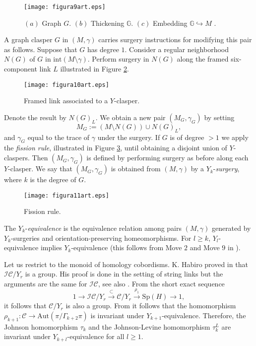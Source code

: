 \documentclass[10pt]{amsart}
\numberwithin{equation}{section}
\numberwithin{equation}{section}
\theoremstyle{definition}
\begin{document}
\begin{figure}[ht!] 
										\centering
                        \texttt{[image: figura9art.eps]}
												\caption{$(a)$ Graph $G$. $(b)$ Thickening $\mathbb{G}$. $(c)$ Embedding $\mathbb{G}\hookrightarrow M$ .}
												\label{figura4.9}
\end{figure}

A graph clasper $G$ in $(M,\gamma)$ carries surgery instructions for modifying this pair as follows. Suppose that $G$ has degree $1$. Consider a regular neighborhood $N(G)$ of $G$ in $\text{int}(M\setminus\gamma)$. Perform surgery in $N(G)$ along the framed six-component link $L$ illustrated in Figure \ref{figura4.10}. 

\begin{figure}[ht!] 
										\centering
                        \texttt{[image: figura10art.eps]}
												\caption{Framed link associated to a $Y$-clasper.}
												\label{figura4.10}
\end{figure}

\noindent Denote the result by $N(G)_L$. We obtain a new pair $(M_G,\gamma_G)$ by setting
$$M_G:=\left(M\setminus N(G)\right)\cup N(G)_L,$$
and $\gamma_G$ equal to the trace of $\gamma$ under the surgery. If $G$ is of degree $>1$ we apply the \emph{fission rule},  illustrated in Figure \ref{figura4.11}, until obtaining a disjoint union of $Y$-claspers. Then $(M_G,\gamma_G)$ is defined by performing surgery as before along each $Y$-clasper.  We say that $(M_G,\gamma_G)$ is obtained from $(M,\gamma)$ by a  $Y_k$-\emph{surgery}, where $k$ is the degree of $G$.

\begin{figure}[ht!] 
										\centering
                        \texttt{[image: figura11art.eps]}
												\caption{Fission rule.}
												\label{figura4.11}
\end{figure}


The $Y_k$-\emph{equivalence} is the equivalence relation among pairs $(M,\gamma)$ generated by $Y_k$-surgeries and orientation-preserving homeomorphisms. For $l\geq k$,  $Y_l$-equivalence implies $Y_k$-equivalence (this follows from Move $2$ and Move $9$ in \cite[Section 2.4]{MR1735632}).

Let us restrict to  the monoid of homology cobordisms.  K. Habiro proved in \cite[Theorem 5.4]{MR1735632} that $\mathcal{IC}/Y_r$ is a group. His proof is done in the setting of  string links but  the  arguments are the same  for $\mathcal{IC}$, see also \cite[Theorem 9.2]{MR1715131}.  From the short exact sequence
\begin{equation*}%
1\longrightarrow \mathcal{IC}/{Y_r}\stackrel{\subset}{\longrightarrow} \mathcal{C}/{Y_r}\stackrel{\rho_1}{\longrightarrow}\text{Sp}(H)\longrightarrow 1,
\end{equation*}
it follows that $\mathcal{C}/Y_r$ is also a group. From  \cite[Lemma 6.1]{MR3074379} it follows that the  homomorphism $\rho_{k+1}:\mathcal{C}\rightarrow\text{Aut}(\pi/\Gamma_{k+2}\pi)$  is invariant under $Y_{k+1}$-equivalence. Therefore, the Johnson homomorphism $\tau_k$ and the Johnson-Levine homomorphism $\tau_k^L$ are invariant under $Y_{k+l}$-equivalence for all $l\geq 1$. 
\end{document}
